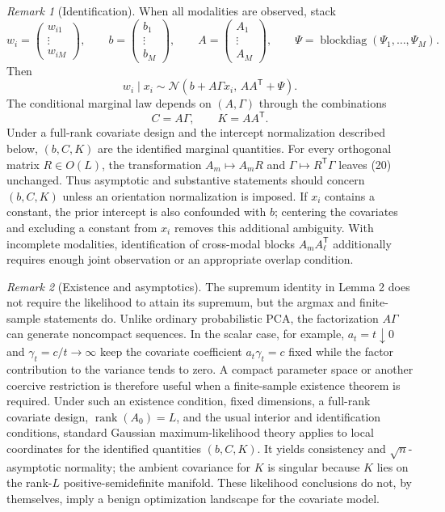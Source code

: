 \documentclass[11pt]{article}
\newcommand{\N}{\mathcal{N}}
\newcommand{\trans}{\mathsf{T}}
\theoremstyle{remark}
\newtheorem{remark}{Remark}
\begin{document}
\begin{remark}[Identification]
When all modalities are observed, stack
\[
w_i=
\begin{pmatrix}w_{i1}\\ \vdots\\ w_{iM}\end{pmatrix},
\qquad
b=
\begin{pmatrix}b_1\\ \vdots\\ b_M\end{pmatrix},
\qquad
A=
\begin{pmatrix}A_1\\ \vdots\\ A_M\end{pmatrix},
\qquad
\Psi=\operatorname{blockdiag}(\Psi_1,\ldots,\Psi_M).
\]
Then
\begin{equation}
w_i\mid x_i
\sim
\N\!\left(b+A\Gamma x_i,\,AA^\trans+\Psi\right).
\tag{20}
\end{equation}
The conditional marginal law depends on $(A,\Gamma)$ through the combinations
\[
C=A\Gamma,
\qquad
K=AA^\trans.
\]
Under a full-rank covariate design and the intercept normalization described below, $(b,C,K)$ are the identified marginal quantities.
For every orthogonal matrix $R\in O(L)$, the transformation
$A_m\mapsto A_mR$ and $\Gamma\mapsto R^\trans\Gamma$ leaves (20) unchanged. Thus asymptotic and substantive statements should concern $(b,C,K)$ unless an orientation normalization is imposed. If $x_i$ contains a constant, the prior intercept is also confounded with $b$; centering the covariates and excluding a constant from $x_i$ removes this additional ambiguity. With incomplete modalities, identification of cross-modal blocks $A_mA_\ell^\trans$ additionally requires enough joint observation or an appropriate overlap condition.
\end{remark}

\begin{remark}[Existence and asymptotics]
The supremum identity in Lemma 2 does not require the likelihood to attain its supremum, but the argmax and finite-sample statements do. Unlike ordinary probabilistic PCA, the factorization $A\Gamma$ can generate noncompact sequences. In the scalar case, for example, $a_t=t\downarrow0$ and $\gamma_t=c/t\to\infty$ keep the covariate coefficient $a_t\gamma_t=c$ fixed while the factor contribution to the variance tends to zero. A compact parameter space or another coercive restriction is therefore useful when a finite-sample existence theorem is required. Under such an existence condition, fixed dimensions, a full-rank covariate design, $\operatorname{rank}(A_0)=L$, and the usual interior and identification conditions, standard Gaussian maximum-likelihood theory applies to local coordinates for the identified quantities $(b,C,K)$. It yields consistency and $\sqrt n$-asymptotic normality; the ambient covariance for $K$ is singular because $K$ lies on the rank-$L$ positive-semidefinite manifold. These likelihood conclusions do not, by themselves, imply a benign optimization landscape for the covariate model.
\end{remark}
\end{document}
